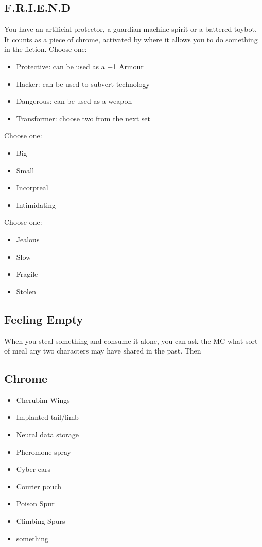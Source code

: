 \documentclass{tufte-book}
\begin{document}
\subsection{F.R.I.E.N.D}
You have an artificial protector, a guardian machine spirit or a battered toybot. It counts as a piece of chrome, activated by  where it allows you to do something in the fiction.
Choose one: 
	\begin{itemize}
	\item Protective: can be used as a +1 Armour
	\item Hacker: can be used to subvert technology
	\item Dangerous: can be used as a weapon
	\item Transformer: choose two from the next set
	\end{itemize}
Choose one: 
	\begin{itemize}
	\item Big
	\item Small
	\item Incorpreal
	\item Intimidating
	\end{itemize}
Choose one: 
	\begin{itemize}
	\item Jealous
	\item Slow
	\item Fragile
	\item Stolen
	\end{itemize}

\subsection{Feeling Empty}
When you steal something and consume it alone, you can ask the MC what sort of meal any two characters may have shared in the past. Then 

\subsection{Chrome}
\begin{multicols}{3}
\begin{itemize}
\item Cherubim Wings
\item Implanted tail/limb
\item Neural data storage
\item Pheromone spray
\item Cyber ears
\item Courier pouch
\item Poison Spur
\item Climbing Spurs
\item something
\end{itemize}
\end{multicols}
\end{document}
